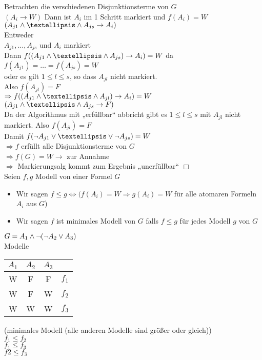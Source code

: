 Betrachten die verschiedenen Disjunktionsterme von $G$\\
$(A_i \rightarrow W)$ Dann ist $A_i$ im 1 Schritt markiert und $f(A_i) = W$\\
$(A_{j1} \AND … \AND A_{js} \rightarrow A_i)$\\

Entweder \\
$A_{j1}, …, A_{js}$ und $A_i$ markiert\\
Dann $f((A_{j1} \AND … \AND A_{js}) \rightarrow A_i) = W$ da\\
$f(A_{j1}) = … = f(A_{js})=W$\\

oder es gilt $1 \leq l \leq s$, so dass $A_{jl}$ nicht markiert.\\
Also $f(A_{jl}) = F$\\
$\Rightarrow f((A_{j1} \AND … \AND A_{jl}) \rightarrow A_i) = W$\\

$(A_{j1} \AND … \AND A_{js} \rightarrow F)$\\
Da der Algorithmus mit „erfüllbar“ abbricht gibt es $1 \leq l \leq s$ mit $A_{jl}$ nicht markiert. Also $f(A_{jl})=F$\\
Damit $f(\neg A_{j1} \OR … \OR \neg A_{js}) = W$\\
$\Rightarrow f$ erfüllt alle Disjunktionsterme von $G$\\
$\Rightarrow f(G) = W  \rightarrow$ \widerspruch zur Annahme\\
$\Rightarrow$ Markierungsalg kommt zum Ergebnis „unerfüllbar“ $\Box$\\

Seien $f,g$ Modell von einer Formel $G$
\begin{itemize}
\item Wir sagen $f \leq g \Leftrightarrow (f(A_i) = W \Rightarrow g(A_i) =W$ für alle atomaren Formeln $A_i$ aus $G$)

\item Wir sagen $f$ ist minimales Modell von $G$ falls $f \leq g$ für jedes Modell $g$ von $G$
\end{itemize}

\beispiel{}
$G = A_1 \wedge \neg (\neg A_2 \vee A_3)$\\
Modelle\\
\begin{tabular}{c|c|cr}
$A_1$ & $A_2$ & $A_3$ &  \\
\hline
W & F & F & $f_1$ \\
W & F & W & $f_2$ \\
W & W & W & $f_3$ \\
\end{tabular}
(minimales Modell (alle anderen Modelle sind größer oder gleich))\\
$f_1 \leq f_2$\\
$f_1 \leq f_3$\\
$f2 \leq f_3$\\

